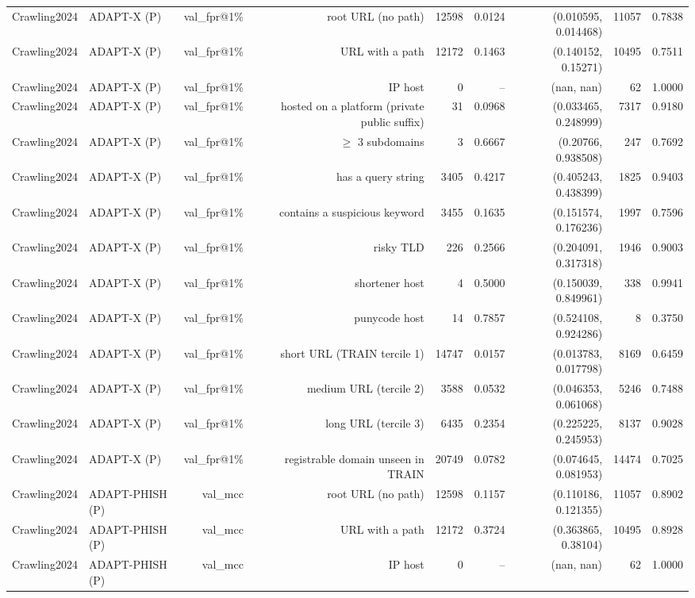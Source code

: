 \begin{table}[t]
\begin{tabular}{llrrrrrrr}
Crawling2024 & ADAPT-X (P) & val\_fpr@1\% & root URL (no path) & 12598 & 0.0124 & (0.010595, 0.014468) & 11057 & 0.7838 \\
Crawling2024 & ADAPT-X (P) & val\_fpr@1\% & URL with a path & 12172 & 0.1463 & (0.140152, 0.15271) & 10495 & 0.7511 \\
Crawling2024 & ADAPT-X (P) & val\_fpr@1\% & IP host & 0 & -- & (nan, nan) & 62 & 1.0000 \\
Crawling2024 & ADAPT-X (P) & val\_fpr@1\% & hosted on a platform (private public suffix) & 31 & 0.0968 & (0.033465, 0.248999) & 7317 & 0.9180 \\
Crawling2024 & ADAPT-X (P) & val\_fpr@1\% & $\geq$ 3 subdomains & 3 & 0.6667 & (0.20766, 0.938508) & 247 & 0.7692 \\
Crawling2024 & ADAPT-X (P) & val\_fpr@1\% & has a query string & 3405 & 0.4217 & (0.405243, 0.438399) & 1825 & 0.9403 \\
Crawling2024 & ADAPT-X (P) & val\_fpr@1\% & contains a suspicious keyword & 3455 & 0.1635 & (0.151574, 0.176236) & 1997 & 0.7596 \\
Crawling2024 & ADAPT-X (P) & val\_fpr@1\% & risky TLD & 226 & 0.2566 & (0.204091, 0.317318) & 1946 & 0.9003 \\
Crawling2024 & ADAPT-X (P) & val\_fpr@1\% & shortener host & 4 & 0.5000 & (0.150039, 0.849961) & 338 & 0.9941 \\
Crawling2024 & ADAPT-X (P) & val\_fpr@1\% & punycode host & 14 & 0.7857 & (0.524108, 0.924286) & 8 & 0.3750 \\
Crawling2024 & ADAPT-X (P) & val\_fpr@1\% & short URL (TRAIN tercile 1) & 14747 & 0.0157 & (0.013783, 0.017798) & 8169 & 0.6459 \\
Crawling2024 & ADAPT-X (P) & val\_fpr@1\% & medium URL (tercile 2) & 3588 & 0.0532 & (0.046353, 0.061068) & 5246 & 0.7488 \\
Crawling2024 & ADAPT-X (P) & val\_fpr@1\% & long URL (tercile 3) & 6435 & 0.2354 & (0.225225, 0.245953) & 8137 & 0.9028 \\
Crawling2024 & ADAPT-X (P) & val\_fpr@1\% & registrable domain unseen in TRAIN & 20749 & 0.0782 & (0.074645, 0.081953) & 14474 & 0.7025 \\
Crawling2024 & ADAPT-PHISH (P) & val\_mcc & root URL (no path) & 12598 & 0.1157 & (0.110186, 0.121355) & 11057 & 0.8902 \\
Crawling2024 & ADAPT-PHISH (P) & val\_mcc & URL with a path & 12172 & 0.3724 & (0.363865, 0.38104) & 10495 & 0.8928 \\
Crawling2024 & ADAPT-PHISH (P) & val\_mcc & IP host & 0 & -- & (nan, nan) & 62 & 1.0000 \\

\end{tabular}
\end{table}
